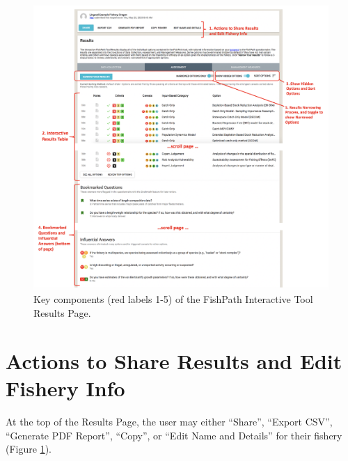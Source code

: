 \documentclass[
  11pt,
]{book}
\begin{document}
\begin{figure}

{\centering \includegraphics[width=0.95\linewidth]{images/results-components} 

}

\caption{Key components (red labels 1-5) of the FishPath Interactive Tool Results Page.}\label{fig:results-components}
\end{figure}

\hypertarget{Results-Actions}{%
\section{Actions to Share Results and Edit Fishery Info}\label{Results-Actions}}

At the top of the Results Page, the user may either ``Share'', ``Export CSV'', ``Generate PDF Report'', ``Copy'', or ``Edit Name and Details'' for their fishery (Figure \ref{fig:results-components}).
\end{document}
